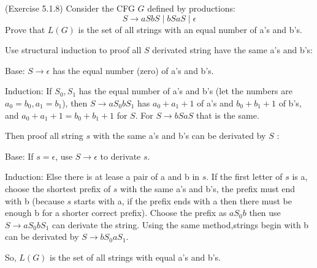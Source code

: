 \documentclass[10pt]{homework}
\begin{document}

\begin{problem} (Exercise 5.1.8)
  Consider the CFG $G$ defined by productions:
  \begin{equation*}
    S \rightarrow aSbS \;|\; bSaS \;|\; \epsilon
  \end{equation*}
  Prove that $L(G)$ is the set of all strings with an equal number of a's and
  b's.
\end{problem}

\begin{solution}
    Use structural induction to proof all $S$ derivated string have the same a's and b's:

    Base: $S\rightarrow \epsilon$ has the equal number (zero) of a's and b's.

    Induction: If $S_0,S_1$ has the equal number of a's and b's (let the numbers are $a_0=b_0,a_1=b_1$), then $S\rightarrow aS_0bS_1$ has $a_0+a_1+1$ of a's and $b_0+b_1+1$ of b's, and $a_0+a_1+1=b_0+b_1+1$ for $S$. For $S\rightarrow bSaS$ that is the same.

    Then proof all string $s$ with the same a's and b's can be derivated by $S$ :

    Base: If $s=\epsilon$, use $S\rightarrow \epsilon$ to derivate $s$.

    Induction: Else there is at lease a pair of a and b in $s$. If the first letter of $s$ is a, choose the shortest prefix of $s$ with the same a's and b's, the prefix must end with b (because $s$ starts with a, if the prefix ends with a then there must be enough b for a shorter correct prefix). Choose the prefix as $aS_0b$ then use $S\rightarrow aS_0bS_1$ can derivate the string. Using the same method,strings begin with b can be derivated by $S\rightarrow bS_0aS_1$.

    So, $L(G)$ is the set of all strings with equal a's and b's.
\end{solution}
\end{document}
